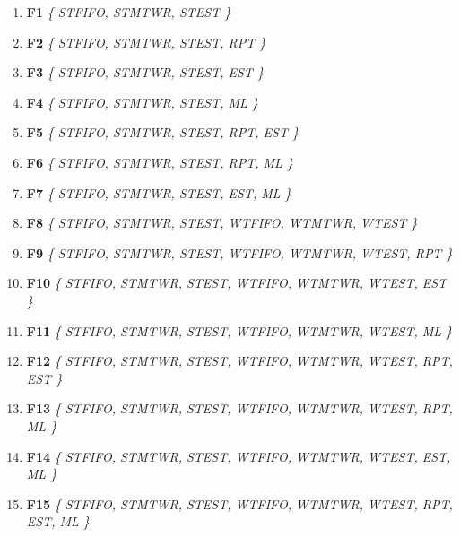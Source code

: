 \documentclass[runningheads]{llncs}
\begin{document}
\begin{enumerate}
\fontsize{9pt}{10pt}
\item \textbf{F1} \textrightarrow \textit{\{ ST\textunderscore FIFO, ST\textunderscore MTWR, ST\textunderscore EST \}}
\item \textbf{F2} \textrightarrow \textit{\{ ST\textunderscore FIFO, ST\textunderscore MTWR, ST\textunderscore EST, RPT \}} 
\item \textbf{F3} \textrightarrow \textit{\{ ST\textunderscore FIFO, ST\textunderscore MTWR, ST\textunderscore EST, EST \}} 
\item \textbf{F4} \textrightarrow \textit{\{ ST\textunderscore FIFO, ST\textunderscore MTWR, ST\textunderscore EST, ML \}} 
\item \textbf{F5} \textrightarrow \textit{\{ ST\textunderscore FIFO, ST\textunderscore MTWR, ST\textunderscore EST, RPT, EST \}}
\item \textbf{F6} \textrightarrow \textit{\{ ST\textunderscore FIFO, ST\textunderscore MTWR, ST\textunderscore EST, RPT, ML \}} 
\item \textbf{F7} \textrightarrow \textit{\{ ST\textunderscore FIFO, ST\textunderscore MTWR, ST\textunderscore EST, EST, ML \}} 
\item \textbf{F8} \textrightarrow \textit{\{ ST\textunderscore FIFO, ST\textunderscore MTWR, ST\textunderscore EST, WT\textunderscore FIFO, WT\textunderscore MTWR, WT\textunderscore EST \}} 
\item \textbf{F9} \textrightarrow \textit{\{ ST\textunderscore FIFO, ST\textunderscore MTWR, ST\textunderscore EST, WT\textunderscore FIFO, WT\textunderscore MTWR, WT\textunderscore EST, RPT \}} 
\item \textbf{F10} \textrightarrow \textit{\{ ST\textunderscore FIFO, ST\textunderscore MTWR, ST\textunderscore EST, WT\textunderscore FIFO, WT\textunderscore MTWR, WT\textunderscore EST, EST \}} 
\item \textbf{F11} \textrightarrow \textit{\{ ST\textunderscore FIFO, ST\textunderscore MTWR, ST\textunderscore EST, WT\textunderscore FIFO, WT\textunderscore MTWR, WT\textunderscore EST, ML \}}
\item \textbf{F12} \textrightarrow \textit{\{ ST\textunderscore FIFO, ST\textunderscore MTWR, ST\textunderscore EST, WT\textunderscore FIFO, WT\textunderscore MTWR, WT\textunderscore EST, RPT, EST \}}
\item \textbf{F13} \textrightarrow \textit{\{ ST\textunderscore FIFO, ST\textunderscore MTWR, ST\textunderscore EST, WT\textunderscore FIFO, WT\textunderscore MTWR, WT\textunderscore EST, RPT, ML \}}
\item \textbf{F14} \textrightarrow \textit{\{ ST\textunderscore FIFO, ST\textunderscore MTWR, ST\textunderscore EST, WT\textunderscore FIFO, WT\textunderscore MTWR, WT\textunderscore EST, EST, ML \}}
\item \textbf{F15} \textrightarrow \textit{\{ ST\textunderscore FIFO, ST\textunderscore MTWR, ST\textunderscore EST, WT\textunderscore FIFO, WT\textunderscore MTWR, WT\textunderscore EST, RPT, EST, ML \}}
\end{enumerate}
\end{document}
